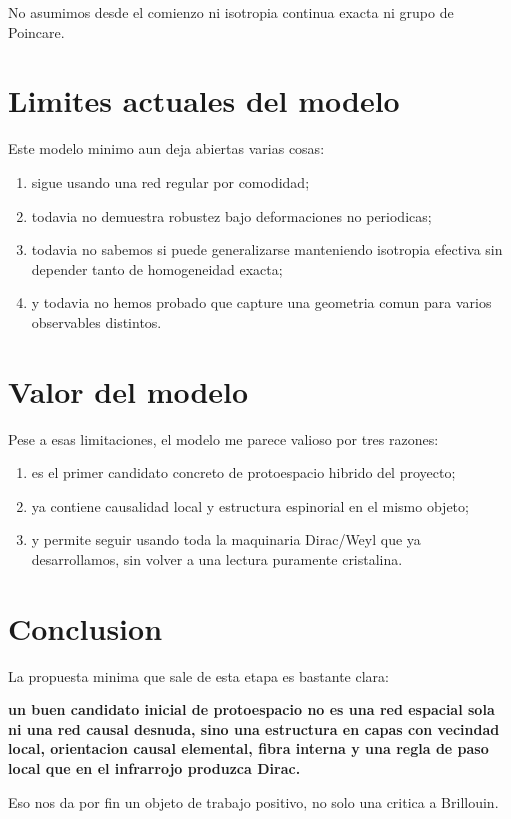 No asumimos desde el comienzo ni isotropia continua exacta ni grupo de Poincare.

\section{Limites actuales del modelo}
Este modelo minimo aun deja abiertas varias cosas:
\begin{enumerate}[label=\arabic*.]
    \item sigue usando una red regular por comodidad;
    \item todavia no demuestra robustez bajo deformaciones no periodicas;
    \item todavia no sabemos si puede generalizarse manteniendo isotropia efectiva sin depender tanto de homogeneidad exacta;
    \item y todavia no hemos probado que capture una geometria comun para varios observables distintos.
\end{enumerate}

\section{Valor del modelo}
Pese a esas limitaciones, el modelo me parece valioso por tres razones:
\begin{enumerate}[label=\arabic*.]
    \item es el primer candidato concreto de protoespacio hibrido del proyecto;
    \item ya contiene causalidad local y estructura espinorial en el mismo objeto;
    \item y permite seguir usando toda la maquinaria Dirac/Weyl que ya desarrollamos, sin volver a una lectura puramente cristalina.
\end{enumerate}

\section{Conclusion}
La propuesta minima que sale de esta etapa es bastante clara:
\begin{displayquote}
\textbf{un buen candidato inicial de protoespacio no es una red espacial sola ni una red causal desnuda, sino una estructura en capas con vecindad local, orientacion causal elemental, fibra interna y una regla de paso local que en el infrarrojo produzca Dirac.}
\end{displayquote}

Eso nos da por fin un objeto de trabajo positivo, no solo una critica a Brillouin.

